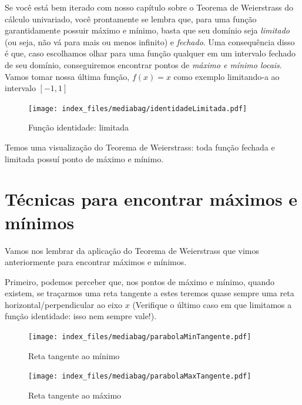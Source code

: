 \documentclass[
  portuguese,
  letterpaper,
  DIV=11,
  numbers=noendperiod]{scrreport}
\begin{document}
Se você está bem iterado com nosso capítulo sobre o Teorema de
Weierstrass do cálculo univariado, você prontamente se lembra que, para
uma função garantidamente possuir máximo e mínimo, basta que seu domínio
seja \emph{limitado} (ou seja, não vá para mais ou menos infinito) e
\emph{fechado}. Uma consequência disso é que, caso escolhamos olhar para
uma função qualquer em um intervalo fechado de seu domínio,
conseguiremos encontrar pontos de \emph{máximo e mínimo locais}. Vamos
tomar nossa última função, \(f(x) = x\) como exemplo limitando-a ao
intervalo \([-1,1]\)

\begin{figure}[H]

\caption{Função identidade: limitada}

{\centering \texttt{[image: index\_files/mediabag/identidadeLimitada.pdf]}

}

\end{figure}%

Temos uma visualização do Teorema de Weierstrass: toda função fechada e
limitada possuí ponto de máximo e mínimo.

\section{Técnicas para encontrar máximos e
mínimos}\label{tuxe9cnicas-para-encontrar-muxe1ximos-e-muxednimos}

Vamos nos lembrar da aplicação do Teorema de Weierstrass que vimos
anteriormente para encontrar máximos e mínimos.

Primeiro, podemos perceber que, nos pontos de máximo e mínimo, quando
existem, se traçarmos uma reta tangente a estes teremos quase sempre uma
reta horizontal/perpendicular ao eixo \(x\) (Verifique o último caso em
que limitamos a função identidade: isso nem sempre vale!).

\begin{figure}[H]

\caption{Reta tangente ao mínimo}

{\centering \texttt{[image: index\_files/mediabag/parabolaMinTangente.pdf]}

}

\end{figure}%

\begin{figure}[H]

\caption{Reta tangente ao máximo}

{\centering \texttt{[image: index\_files/mediabag/parabolaMaxTangente.pdf]}

}

\end{figure}%
\end{document}
